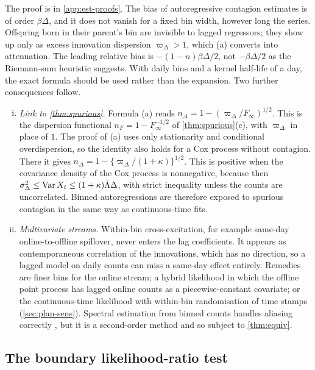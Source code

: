 The proof is in \cref{app:est-proofs}. The bias of autoregressive contagion estimates is
of order $\beta\Delta$, and it does not vanish for a fixed bin width, however long the
series. Offspring born in their parent's bin are invisible to lagged regressors; they show
up only as excess innovation dispersion $\varpi_\Delta>1$, which (a) converts into
attenuation. The leading relative bias is $-(1-n)\beta\Delta/2$, not $-\beta\Delta/2$ as the
Riemann-sum heuristic suggests. With daily bins and a kernel half-life of a day, the exact
formula should be used rather than the expansion. Two further consequences follow.
\begin{enumerate}[(i)]
  \item \emph{Link to \cref{thm:spurious}.} Formula (a) reads
    $n_\Delta=1-(\varpi_\Delta/F_\infty)^{1/2}$. This is the dispersion functional
    $n_F=1-F_\infty^{-1/2}$ of \cref{thm:spurious}(c), with $\varpi_\Delta$ in place of
    $1$. The proof of (a) uses only stationarity and conditional overdispersion, so the
    identity also holds for a Cox process without contagion. There it gives
    $n_\Delta=1-\{\varpi_\Delta/(1+\kappa)\}^{1/2}$. This is positive when the covariance
    density of the Cox process is nonnegative, because then
    $\sigma^2_\Delta\le\operatorname{Var} X_t\le(1+\kappa)\bar\Lambda\Delta$, with strict inequality
    unless the counts are uncorrelated. Binned autoregressions are therefore exposed to
    spurious contagion in the same way as continuous-time fits.
  \item \emph{Multivariate streams.} Within-bin cross-excitation, for example same-day
    online-to-offline spillover, never enters the lag coefficients. It appears as
    contemporaneous correlation of the innovations, which has no direction, so a lagged
    model on daily counts can miss a same-day effect entirely. Remedies are finer bins for
    the online stream; a hybrid likelihood in which the offline point process has lagged
    online counts as a piecewise-constant covariate; or the continuous-time likelihood with
    within-bin randomisation of time stamps (\cref{sec:plan-sens}). Spectral estimation
    from binned counts handles aliasing correctly \citep{cheysson2022}, but it is a
    second-order method and so subject to \cref{thm:equiv}.
\end{enumerate}

\subsection{The boundary likelihood-ratio test}\label{app:est-lrt}

